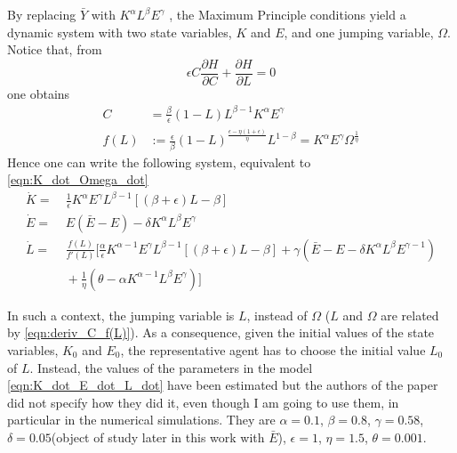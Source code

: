 By replacing $\bar{Y}$ with $K^\alpha L^\beta E^\gamma$ , the Maximum Principle conditions yield a dynamic system with two state variables, $K$ and $E$, and one jumping variable, $\Omega$. Notice that, from 
$$\epsilon C\frac{\partial H}{\partial C}+\frac{\partial H}{\partial L}=0$$
one obtains
\begin{equation} \label{eqn:deriv_C_f(L)}
\begin{split}
	C& =\frac{\beta}{\epsilon}(1-L)L^{\beta-1}K^\alpha E^\gamma \\
	f(L)& :=\frac{\epsilon}{\beta}(1-L)^{\frac{\epsilon-\eta(1+\epsilon)}{\eta}}L^{1-\beta}=K^\alpha E^\gamma \Omega^{\frac{1}{\eta}}
\end{split}
\end{equation}
Hence one can write the following system, equivalent to \eqref{eqn:K_dot_Omega_dot}
\begin{equation} \label{eqn:K_dot_E_dot_L_dot}
	\begin{split}
		\dot{K} =&\ \frac{1}{\epsilon} K^\alpha E^\gamma  L^{\beta-1}[(\beta+\epsilon)L-\beta] \\
		\dot{E} =&\ E(\bar{E}-E)-\delta K^\alpha L^\beta E^\gamma \\
		\dot{L} =&\ \frac{f(L)}{f'(L)} \Big[\frac{\alpha}{\epsilon}K^{\alpha-1} E^\gamma  L^{\beta-1}[(\beta+\epsilon)L-\beta]+\gamma(\bar{E}-E-\delta K^\alpha L^\beta E^{\gamma-1})\\
		&\ +\frac{1}{\eta}(\theta-\alpha K^{\alpha-1}L^\beta E^\gamma) \Big]
	\end{split}
\end{equation}

In such a context, the jumping variable is $L$, instead of $\Omega$ ($L$ and $\Omega$ are related by \eqref{eqn:deriv_C_f(L)}). As a consequence, given the initial values of the state variables, $K_0$ and $E_0$, the representative agent has to choose the initial value $L_0$ of $L$. Instead, the values of the parameters in the model \eqref{eqn:K_dot_E_dot_L_dot} have been estimated but the authors of the paper did not specify how they did it, even though I am going to use them, in particular in the numerical simulations. They are $\alpha=0.1$, $\beta=0.8$, $\gamma=0.58$, $\delta=0.05$(object of study later in this work with $\bar{E}$), $\epsilon=1$, $\eta=1.5$, $\theta=0.001$.